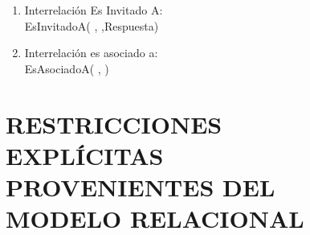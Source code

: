 \documentclass{article}
\begin{document}
\begin{figure}[h]
\begin{enumerate}
\item Interrelaci\'on Es Invitado A:\\

EsInvitadoA( { } \quad,  { } \quad,Respuesta)\\ 

\item Interrelaci\'on es asociado a:\\

EsAsociadoA( { } \quad, { } \quad)\\

\end{enumerate}


\newpage

\section{RESTRICCIONES EXPL\'ICITAS PROVENIENTES DEL MODELO RELACIONAL}


\end{figure}
\end{document}
